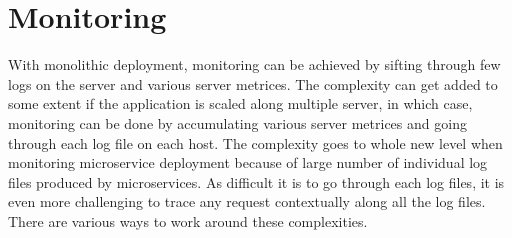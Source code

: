 \section{Monitoring}\label{section:challanges_of_microservices_architecture/monitoring}
With monolithic deployment, monitoring can be achieved by sifting through few logs on the server and various server metrices. The complexity can get added to some extent if the application is scaled along multiple server, in which case, monitoring can be done by accumulating various server metrices and going through each log file on each host.
The complexity goes to whole new level when monitoring microservice deployment because of large number of individual log files produced by microservices. As difficult it is to go through each log files, it is even more challenging to trace any request contextually along all the log files.
\\
There are various ways to work around these complexities. \cite{Newman:2015aa} \cite{Simone:2014aa}
